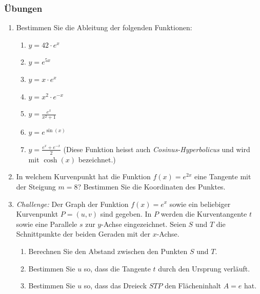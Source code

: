 \subsubsection*{Übungen}
\begin{enumerate}
    \item Bestimmen Sie die Ableitung der folgenden Funktionen:
          \begin{enumerate}
              \item $y= 42\cdot e^x$
              \item $y= e^{5x}$
              \item $y= x\cdot e^x$
              \item $y= x^2 \cdot e^{-x}$
              \item $y= \frac{e^x}{x^2+1}$
              \item $y= e^{\sin(x)}$
              \item $y = \frac{e^x+e^{-x}}{2}$ (Diese Funktion heisst auch \emph{Cosinus-Hyperbolicus} und wird mit $\cosh(x)$ bezeichnet.)
          \end{enumerate}
    \item In welchem Kurvenpunkt hat die Funktion $f(x) = e^{2x}$ eine Tangente mit der Steigung $m=8$? Bestimmen Sie die Koordinaten des Punktes.
    \item \emph{Challenge:} Der Graph der Funktion $f(x) = e^x$ sowie ein beliebiger Kurvenpunkt $P=(u,v)$ sind gegeben. In $P$ werden die Kurventangente $t$ sowie eine Parallele $s$ zur $y$-Achse eingezeichnet. Seien $S$ und $T$ die Schnittpunkte der beiden Geraden mit der $x$-Achse.
          \begin{enumerate}
              \item Berechnen Sie den Abstand zwischen den Punkten $S$ und $T$.
              \item Bestimmen Sie $u$ so, dass die Tangente $t$ durch den Ursprung verläuft.
              \item Bestimmen Sie $u$ so, dass das Dreieck $STP$ den Flächeninhalt $A=e$ hat.
          \end{enumerate}
\end{enumerate}
\clearpage
